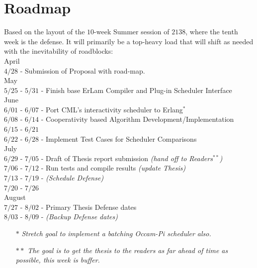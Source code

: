 \section{Roadmap}

Based on the layout of the $10$-week Summer session of $2138$, where the tenth week
is the defense. It will primarily be a top-heavy load that will shift as needed
with the inevitability of roadblocks:\\

    April\\
        $4/28$ - Submission of Proposal with road-map.\\

    May\\
        $5/25$ - $5/31$ - Finish base ErLam Compiler and Plug-in Scheduler Interface \\

    June \\
        $6/01$ - $6/07$ - Port CML's interactivity scheduler to Erlang$^*$\\
        $6/08$ - $6/14$ - Cooperativity based Algorithm Development/Implementation \\
        $6/15$ - $6/21$ \\
        $6/22$ - $6/28$ - Implement Test Cases for Scheduler Comparisons\\

    July\\
        $6/29$ - $7/05$ - Draft of Thesis report submission {\em (hand off to Readers$^{**}$)} \\
        $7/06$ - $7/12$ - Run tests and compile results {\em (update Thesis)} \\
        $7/13$ - $7/19$ - {\em(Schedule Defense)}\\
        $7/20$ - $7/26$ \\

    August\\
        $7/27$ - $8/02$ - Primary Thesis Defense dates\\
        $8/03$ - $8/09$ - {\em(Backup Defense dates)}

\begin{itemize}
\item[$*$]{\small\em Stretch goal to implement a batching Occam-Pi scheduler also.}
\item[$**$]{\small\em The goal is to get the thesis to the readers as far ahead of time as possible, this week is buffer.}\\
\end{itemize}

